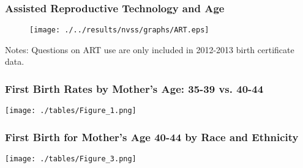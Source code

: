 \documentclass[10pt,letterpaper,subeqn]{beamer}
\begin{document}
\begin{frame}[label=ART]
\frametitle{Assisted Reproductive Technology and Age}
\begin{figure}[htpb!]
\begin{center}
  \centering
  \texttt{[image: ./../results/nvss/graphs/ART.eps]}
  \label{fig:NVSSART}
\end{center}
\end{figure}
\vspace{-5mm}
\footnotesize{Notes: Questions on ART use are only included in 2012-2013
birth certificate data.}
\end{frame}


%

%

%










\begin{frame}
\frametitle{First Birth Rates by Mother's Age: 35-39 vs. 40-44}
\begin{center}
\texttt{[image: ./tables/Figure\_1.png]}
\end{center}
\end{frame}

\begin{frame}
\frametitle{First Birth for Mother's Age 40-44 by Race and Ethnicity}
\begin{center}
\texttt{[image: ./tables/Figure\_3.png]}
\end{center}
\end{frame}
\end{document}
